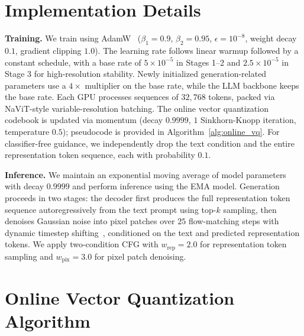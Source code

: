 \documentclass{llmxive}
\providecommand{\beginappendix}{\appendix{\titlefont\sffamily \seedblue{Appendix}\par}}
\begin{document}





\beginappendix

\section{Implementation Details}

\textbf{Training.} We train using AdamW~\cite{adamw} ($\beta_1{=}0.9$, $\beta_2{=}0.95$, $\epsilon{=}10^{-8}$, weight decay $0.1$, gradient clipping $1.0$). The learning rate follows linear warmup followed by a constant schedule, with a base rate of $5{\times}10^{-5}$ in Stages 1--2 and $2.5{\times}10^{-5}$ in Stage 3 for high-resolution stability. Newly initialized generation-related parameters use a $4{\times}$ multiplier on the base rate, while the LLM backbone keeps the base rate. Each GPU processes sequences of $32{,}768$ tokens, packed via NaViT-style variable-resolution batching. The online vector quantization codebook is updated via momentum (decay $0.9999$, $1$ Sinkhorn-Knopp iteration, temperature $0.5$); pseudocode is provided in Algorithm~\ref{alg:online_vq}. For classifier-free guidance, we independently drop the text condition and the entire representation token sequence, each with probability $0.1$.

\textbf{Inference.} We maintain an exponential moving average of model parameters with decay $0.9999$ and perform inference using the EMA model. Generation proceeds in two stages: the decoder first produces the full representation token sequence autoregressively from the text prompt using top-$k$ sampling, then denoises Gaussian noise into pixel patches over $25$ flow-matching steps with dynamic timestep shifting~\cite{sd3}, conditioned on the text and predicted representation tokens. We apply two-condition CFG with $w_{\text{rep}}{=}2.0$ for representation token sampling and $w_{\text{pix}}{=}3.0$ for pixel patch denoising.

\section{Online Vector Quantization Algorithm}
\label{sec:appendix-vq}
\end{document}
